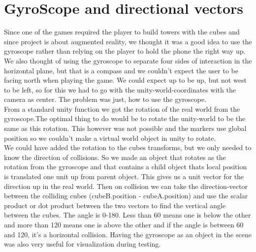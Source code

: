 \section{GyroScope and directional vectors}
Since one of the games required the player to build towers with the cubes and since project is about augmented reality, we thought it was a good idea to use the gyroscope rather than relying on the player to hold the phone the right way up. We also thought of using the gyroscope to separate four sides of interaction in the horizontal plane, but that is a compass and we couldn't expect the user to be facing north when playing the game. We could expect up to be up, but not west to be left, so for this we had to go with the unity-world-coordinates with the camera as center. The problem was just, how to use the gyroscope.\\
From a standard unity function we got the rotation of the real world from the gyroscope.The optimal thing to do would be to rotate the unity-world to be the same as this rotation. This however was not possible and the markers use global position so we couldn't make a virtual world object in unity to rotate.\\
We could have added the rotation to the cubes transforms, but we only needed to know the direction of collisions. So we made an object that rotates as the rotation from the gyroscope and that contains a child object thats local position is translated one unit up from parent object. This gives us a unit vector for the direction up in the real world. Then on collision we can take the direction-vector between the colliding cubes (cubeB.position - cubeA.position) and use the scalar product or dot product between the two vectors to find the vertical angle between the cubes. The angle is 0-180. Less than 60 means one is below the other and more than 120 means one is above the other and if the angle is between 60 and 120, it's a horizontal collision. Having the gyroscope as an object in the scene was also very useful for visualization during testing.




